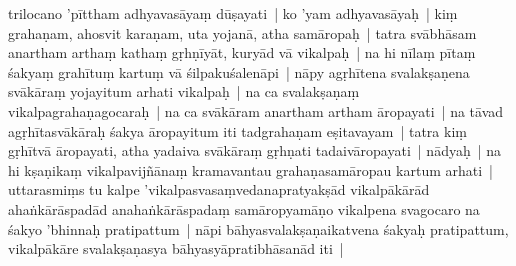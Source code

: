 \documentclass[article,12pt,a4paper]{memoir}%
\newcommand{\persName}[1]{#1}
\newcounter{parCount}
\begin{document}
	  \pstart \leavevmode%
	\label{thakur75-135.5}\persName{trilocano} 'pīttham adhyavasāyaṃ dūṣayati | ko 'yam adhyavasāyaḥ | kiṃ grahaṇam, ahosvit karaṇam, uta yojanā, atha samāropaḥ | tatra svābhāsam anartham arthaṃ kathaṃ gṛhṇīyāt, kuryād vā vikalpaḥ | na hi nīlaṃ pītaṃ śakyaṃ grahītuṃ kartuṃ vā śilpakuśalenāpi | nāpy agṛhītena svalakṣaṇena svākāraṃ yojayitum arhati vikalpaḥ | na ca svalakṣaṇaṃ vikalpagrahaṇagocaraḥ | na ca svākāram anartham artham āropayati | na tāvad agṛhītasvākāraḥ śakya āropayitum iti tadgrahaṇam eṣitavayam | tatra kiṃ gṛhītvā āropayati, atha yadaiva svākāraṃ gṛhṇati tadaivāropayati | nādyaḥ | na hi kṣaṇikaṃ vikalpavijñānaṃ kramavantau grahaṇasamāropau kartum arhati | uttarasmiṃs tu kalpe 'vikalpasvasaṃvedanapratyakṣād vikalpākārād ahaṅkārāspadād \label{ratnakīrtinibandhāvali__36r1PF7IMSHYRSCDBXH9LGA21E4}anahaṅkārāspadaṃ\label{ratnakīrtinibandhāvali__36r1PF7IMSFWSK9HRW3N8HTPE53} samāropyamāṇo vikalpena svagocaro na śakyo 'bhinnaḥ pratipattum | nāpi bāhya\label{ratnakīrtinibandhāvali__36r1PF7IMSDWIZ4SK58R7BCRQH3}svalakṣaṇaikatvena\label{ratnakīrtinibandhāvali__36r1PF7IMSBV2F426HMP90OT53H} śakyaḥ pratipattum, vikalpākāre svalakṣaṇasya bāhyasyāpratibhāsanād iti |
	{}
	\pend%
      
\end{document}
